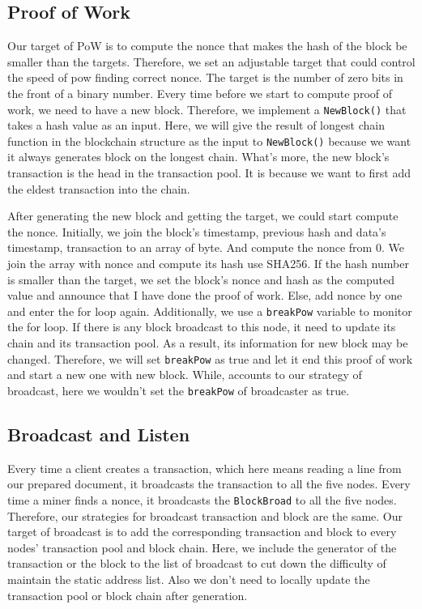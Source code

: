 \documentclass{article}
\begin{document}
    \subsection{Proof of Work}
    Our target of PoW is to compute the nonce that makes the hash of the block be smaller than the targets. Therefore, we set an adjustable target that could control the speed of pow finding correct nonce. The target is the number of zero bits in the front of a binary number. Every time before we start to compute proof of work, we need to have a new block. Therefore, we implement a \verb|NewBlock()| that takes a hash value as an input. Here, we will give the result of longest chain function in the blockchain structure as the input to \verb|NewBlock()| because we want it always generates block on the longest chain. What's more, the new block's transaction is the head in the transaction pool. It is because we want to first add the eldest transaction into the chain. 

    After generating the new block and getting the target, we could start compute the nonce. Initially, we join the block's timestamp, previous hash and data's timestamp, transaction to an array of byte. And compute the nonce from 0. We join the array with nonce and compute its hash use SHA256. If the hash number is smaller than the target, we set the block's nonce and hash as the computed value and announce that I have done the proof of work. Else, add nonce by one and enter the for loop again. Additionally, we use a \verb|breakPow| variable to monitor the for loop. If there is any block broadcast to this node, it need to update its chain and its transaction pool. As a result, its information for new block may be changed. Therefore, we will set \verb|breakPow| as true and let it end this proof of work and start a new one with new block. While, accounts to our strategy of broadcast, here we wouldn't set the \verb|breakPow| of broadcaster as true.
  
    \subsection{Broadcast and Listen}
     Every time a client creates a transaction, which here means reading a line from our prepared document, it broadcasts the transaction to all the five nodes. Every time a miner finds a nonce, it broadcasts the \verb|BlockBroad| to all the five nodes. Therefore, our strategies for broadcast transaction and block are the same. Our target of broadcast is to add the corresponding transaction and block to every nodes' transaction pool and block chain. Here, we include the generator of the transaction or the block to the list of broadcast to cut down the difficulty of maintain the static address list. Also we don't need to locally update the transaction pool or block chain after generation.
\end{document}
